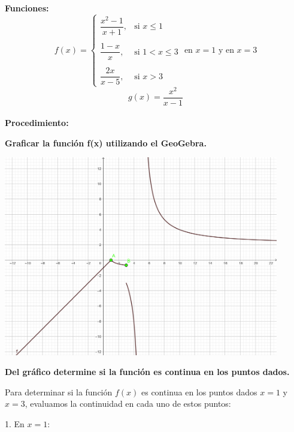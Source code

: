 \documentclass[answers]{exam} %
\begin{document}
\large\textbf{Funciones:}
\[
	f(x) =
	\begin{cases}
		\dfrac{x^2 - 1}{x+1}, & \text{si } x \leq 1   \\
		\\
		\dfrac{1-x}{x},       & \text{si }1< x \leq 3 \\
		\\
		\dfrac{2x}{x-5},      & \text{si } x > 3
	\end{cases}
	\text{ en } x = 1 \text{ y en } x =3
\]
\[
	g(x)=\dfrac{x^2}{x-1}
\]\\[1em]

\vspace{1cm}
\large\textbf{Procedimiento:}\\

\begin{questions}

	\question \large\textbf{Graficar la función f(x) utilizando el GeoGebra.}

	\begin{minipage}{\textwidth}
		\centering
		\includegraphics[width=0.9\textwidth]{public/g1.png}\\
	\end{minipage}

	\vspace{0.5cm}
	\newpage
	\question \large\textbf{Del gráfico determine si la función es continua en los puntos dados.}

	\begin{solution}
		Para determinar si la función \( f(x) \) es continua en los puntos dados \( x = 1 \) y \( x = 3 \), evaluamos la continuidad en cada uno de estos puntos:

		1. En \( x = 1 \):


\end{solution}
\end{questions}
\end{document}
